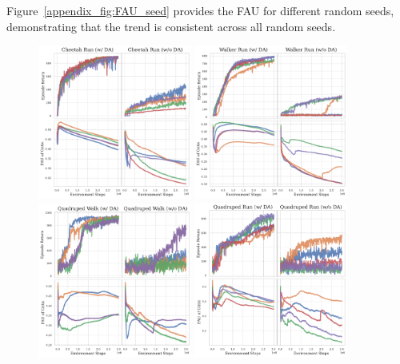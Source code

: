 \newpage
Figure~\ref{appendix_fig:FAU_seed} provides the FAU for different random seeds, demonstrating that the trend is consistent across all random seeds.
\begin{figure}[ht]
  \centering
  \includegraphics[width=0.45\textwidth]{Figures/5Appendix/sing_UTD_cheetah_run.pdf}
  \includegraphics[width=0.45\textwidth]{Figures/5Appendix/sing_UTD_walker_run.pdf}
  \includegraphics[width=0.45\textwidth]{Figures/5Appendix/sing_UTD_quadruped_walk.pdf}
  \includegraphics[width=0.45\textwidth]{Figures/5Appendix/sing_UTD_quadruped_run.pdf}

\end{figure}
